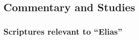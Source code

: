 

	
	
	
	
\subsection{Commentary and Studies} %
	\label{ELIAS-COMMENTARY}

	
		
	\subsubsection{Scriptures relevant to ``Elias''}
		\label{ELIAS-scriptures}
		
